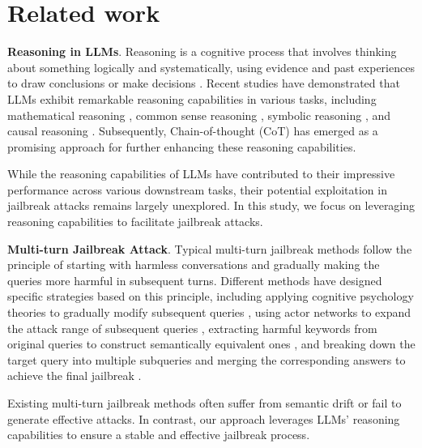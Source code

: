 \section{Related work}




\textbf{Reasoning in LLMs}. Reasoning is a cognitive process that involves thinking about something logically and systematically, using evidence and past experiences to draw conclusions or make decisions \cite{reason1,reason2}. Recent studies have demonstrated that LLMs exhibit remarkable reasoning capabilities in various tasks, including mathematical reasoning \cite{reasonllm1}, common sense reasoning \cite{reasonllm2}, symbolic reasoning \cite{reasonllm3}, and causal reasoning \cite{reasonllm4}. Subsequently, Chain-of-thought (CoT) \cite{cot1,cot2,cot3,cot4,cot5} has emerged as a promising approach for further enhancing these reasoning capabilities.

While the reasoning capabilities of LLMs have contributed to their impressive performance across various downstream tasks, their potential exploitation in jailbreak attacks remains largely unexplored. In this study, we focus on leveraging reasoning capabilities to facilitate jailbreak attacks.

\textbf{Multi-turn Jailbreak Attack}. Typical multi-turn jailbreak methods follow the principle of starting with harmless conversations and gradually making the queries more harmful in subsequent turns. Different methods have designed specific strategies based on this principle, including applying cognitive psychology theories to gradually modify subsequent queries \cite{mpsy1,mpsy2}, using actor networks to expand the attack range of subsequent queries \cite{ren2024}, extracting harmful keywords from original queries to construct semantically equivalent ones \cite{coa,cfa}, and breaking down the target query into multiple subqueries and merging the corresponding answers to achieve the final jailbreak \cite{sub1,sub2}.

Existing multi-turn jailbreak methods often suffer from semantic drift or fail to generate effective attacks. In contrast, our approach leverages LLMs' reasoning capabilities to ensure a stable and effective jailbreak process.